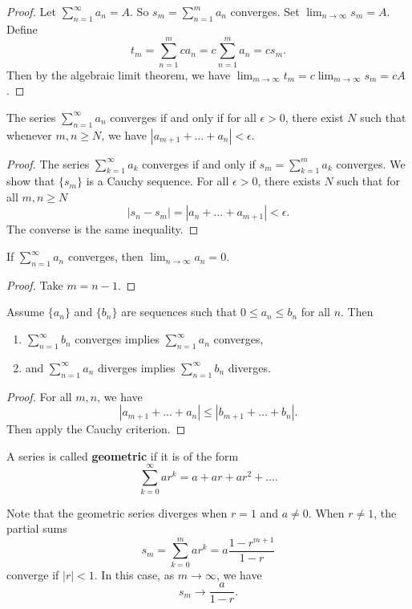 \begin{proof}
  Let $\sum_{n=1}^\infty a_n = A$. So
  $s_m = \sum_{n=1}^m a_n$ converges. Set
  $\lim_{n \to \infty} s_m = A$. Define
  \[
    t_m = \sum_{n=1}^m ca_n = c\sum_{n=1}^m a_n = cs_m
  .\]
  Then by the algebraic limit theorem, we have
  $\lim_{m \to \infty} t_m = c\lim_{m \to \infty} s_m = cA$.
\end{proof}

\begin{theorem}
  The series $\sum_{n=1}^\infty a_n$ converges if and only if
  for all $\epsilon > 0$, there exist $N$ such that
  whenever $m, n \ge N$, we have
$|a_{m+1} + \dots + a_n| < \epsilon$.
\end{theorem}

\begin{proof}
  The series $\sum_{k = 1}^\infty a_k$ converges
  if and only if $s_m = \sum_{k = 1}^m a_k$ converges.
  We show that $\{s_m\}$ is a Cauchy sequence. For
  all $\epsilon > 0$, there exists $N$ such
  that for all $m, n \ge N$
  \[|s_n - s_m| = |a_n + \dots + a_{m+1}| < \epsilon.\]
  The converse is the same inequality.
\end{proof}

\begin{corollary}
  If $\sum_{n=1}^\infty a_n$ converges, then
  $\lim_{n \to \infty} a_n = 0$.
\end{corollary}

\begin{proof}
  Take $m = n - 1$.
\end{proof}

\begin{theorem}
  Assume $\{a_n\}$ and $\{b_n\}$ are sequences such that
  $0 \le a_n \le b_n$ for all $n$. Then
  \begin{enumerate}
    \item $\sum_{n=1}^\infty b_n$ converges implies
      $\sum_{n=1}^\infty a_n$ converges,
    \item and $\sum_{n=1}^\infty a_n$ diverges implies
      $\sum_{n=1}^\infty b_n$ diverges.
  \end{enumerate}
\end{theorem}

\begin{proof}
  For all $m, n$, we have
  \[
    |a_{m + 1} + \dots + a_n| \le |b_{m + 1} + \dots + b_n|
  .\]
  Then apply the Cauchy criterion.
\end{proof}

\begin{definition}
  A series is called \textbf{geometric} if it is of the
  form
  \[
    \sum_{k=0}^\infty ar^k = a + ar + ar^2 + \dots
  .\]
\end{definition}

Note that the geometric series diverges when $r = 1$ and
$a \ne 0$. When $r \ne 1$, the partial sums
\[
  s_m = \sum_{k=0}^m ar^k = a\frac{1 - r^{m + 1}}{1 - r}
\]
converge if $|r| < 1$. In this case, as $m \to \infty$, we
have
\[
  s_m \to \frac{a}{1 - r}
.\]
